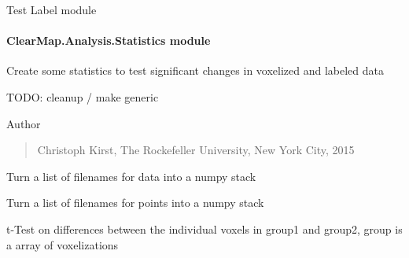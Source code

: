 \documentclass[letterpaper,10pt,english]{sphinxmanual}
\begin{document}
\begin{fulllineitems}
\label{api/ClearMap.Analysis:ClearMap.Analysis.Label.test}
Test Label module

\end{fulllineitems}



\paragraph{ClearMap.Analysis.Statistics module}
\label{api/ClearMap.Analysis:clearmap-analysis-statistics-module}\label{api/ClearMap.Analysis:module-ClearMap.Analysis.Statistics}
Create some statistics to test significant changes
in voxelized and labeled data

TODO: cleanup / make generic

Author
\begin{quote}

Christoph Kirst, The Rockefeller University, New York City, 2015
\end{quote}

\begin{fulllineitems}
\label{api/ClearMap.Analysis:ClearMap.Analysis.Statistics.readDataGroup}
Turn a list of filenames for data into a numpy stack

\end{fulllineitems}


\begin{fulllineitems}
\label{api/ClearMap.Analysis:ClearMap.Analysis.Statistics.readPointsGroup}
Turn a list of filenames for points into a numpy stack

\end{fulllineitems}


\begin{fulllineitems}
\label{api/ClearMap.Analysis:ClearMap.Analysis.Statistics.tTestVoxelization}
t-Test on differences between the individual voxels in group1 and group2, group is a array of voxelizations

\end{fulllineitems}
\end{document}

